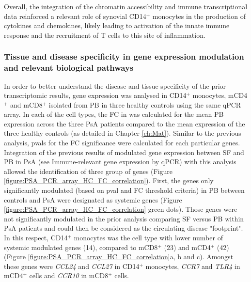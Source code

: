 Overall, the integration of the chromatin accessibility and immune transcriptional data reinforced a relevant role of synovial CD14$^+$ monocytes in the production of cytokines and chemokines, likely leading to activation of the innate immune response and the recruitment of T cells to this site of inflammation. 



\subsubsection{Tissue and disease specificity in gene expression modulation and relevant biological pathways}

In order to better understand the disease and tissue specificity of the prior transcriptomic results, gene expression was analysed in CD14$^+$ monocytes, mCD4$^+$ and mCD8$^+$ isolated from PB in three healthy controls using the same qPCR array. In each of the cell types, the FC in was calculated for the mean PB expression across the three PsA patients compared to the mean expression of the three healthy controls (as detailed in Chapter \ref{ch:Mat}). Similar to the previous analysis, pvals for the FC significance were calculated for each particular genes. Integration of the previous results of modulated gene expression between SF and PB in PsA (see Immune-relevant gene expression by qPCR) with this analysis allowed the identification of three group of genes (Figure \ref{figure:PSA_PCR_array_HC_FC_correlation}). First, the genes only significantly modulated (based on pval and FC threshold criteria) in PB between controls and PsA were designated as systemic genes (Figure \ref{figure:PSA_PCR_array_HC_FC_correlation} green dots). Those genes were not significantly modulated in the prior analysis comparing SF versus PB within PsA patients and could then be considered as the circulating disease "footprint". In this respect, CD14$^+$ monocytes was the cell type with lower number of systemic modulated genes (14), compared to mCD8$^+$ (23) and mCD4$^+$ (42) (Figure \ref{figure:PSA_PCR_array_HC_FC_correlation}a, b and c). Amongst these genes were \textit{CCL24} and \textit{CCL27} in CD14$^+$ monocytes, \textit{CCR7} and \textit{TLR4} in mCD4$^+$ cells and \textit{CCR10} in mCD8$^+$ cells.  


